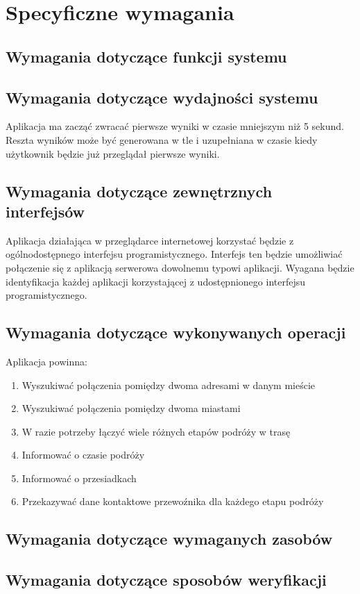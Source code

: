 \documentclass[12pt,a4paper]{report}
\begin{document}
\section{Specyficzne wymagania}
\subsection{Wymagania dotyczące funkcji systemu}
\subsection{Wymagania dotyczące wydajności systemu}
	Aplikacja ma zacząć zwracać pierwsze wyniki w czasie mniejszym niż 5 sekund. Reszta wyników może być generowana w tle i uzupełniana w czasie kiedy użytkownik będzie już przeglądał pierwsze wyniki.
\subsection{Wymagania dotyczące zewnętrznych interfejsów}
Aplikacja działająca w przeglądarce internetowej korzystać będzie z ogólnodostępnego interfejsu programistycznego. Interfejs ten będzie umożliwiać połączenie się z aplikacją serwerowa dowolnemu typowi aplikacji. Wyagana będzie identyfikacja każdej aplikacji korzystającej z udostępnionego interfejsu programistycznego.
\subsection{Wymagania dotyczące wykonywanych operacji}
	Aplikacja powinna:
	\begin{enumerate}	
		\item Wyszukiwać połączenia pomiędzy dwoma adresami w danym mieście
		\item Wyszukiwać połączenia pomiędzy dwoma miastami
		\item W razie potrzeby łączyć wiele różnych etapów podróży w trasę
		\item Informować o czasie podróży
		\item Informować o przesiadkach
		\item Przekazywać dane kontaktowe przewoźnika dla każdego etapu podróży 
	\end{enumerate}
\subsection{Wymagania dotyczące wymaganych zasobów}
\subsection{Wymagania dotyczące sposobów weryfikacji}
\end{document}
